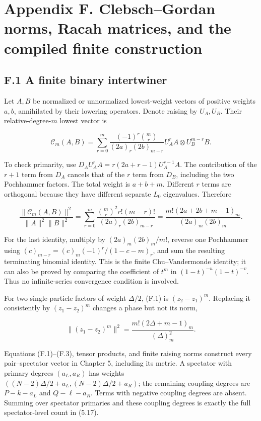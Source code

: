 \clearpage
\hypertarget{appendix-f.-clebschgordan-norms-racah-matrices-and-the-compiled-finite-construction}{%
\section{Appendix F. Clebsch--Gordan norms, Racah matrices, and the compiled finite construction}\label{appendix-f.-clebschgordan-norms-racah-matrices-and-the-compiled-finite-construction}}

\hypertarget{f.1-a-finite-binary-intertwiner}{%
\subsection{F.1 A finite binary intertwiner}\label{f.1-a-finite-binary-intertwiner}}

Let \(A,B\) be normalized or unnormalized lowest-weight vectors of positive weights \(a,b\), annihilated by their lowering operators. Denote raising by \(U_A,U_B\). Their relative-degree-\(m\) lowest vector is

\[
\mathcal C_m(A,B)=\sum_{r=0}^m
\frac{(-1)^r\binom mr}{(2a)_r(2b)_{m-r}}
U_A^rA\otimes U_B^{m-r}B.
\tag{F.1}
\]

To check primarity, use \(D_AU_A^rA=r(2a+r-1)U_A^{r-1}A\). The contribution of the \(r+1\) term from \(D_A\) cancels that of the \(r\) term from \(D_B\), including the two Pochhammer factors. The total weight is \(a+b+m\). Different \(r\) terms are orthogonal because they have different separate \(L_0\) eigenvalues. Therefore

\[
\frac{\|\mathcal C_m(A,B)\|^2}{\|A\|^2\|B\|^2}
=\sum_{r=0}^m\frac{\binom mr^2r!(m-r)!}{(2a)_r(2b)_{m-r}}
=\frac{m!(2a+2b+m-1)_m}{(2a)_m(2b)_m}.
\tag{F.2}
\]

For the last identity, multiply by \((2a)_m(2b)_m/m!\), reverse one Pochhammer using \((c)_{m-r}=(c)_m(-1)^r/(1-c-m)_r\), and sum the resulting terminating binomial identity. This is the finite Chu--Vandermonde identity; it can also be proved by comparing the coefficient of \(t^m\) in \((1-t)^{-u}(1-t)^{-v}\). Thus no infinite-series convergence condition is involved.

For two single-particle factors of weight \(\Delta/2\), (F.1) is \((z_2-z_1)^m\). Replacing it consistently by \((z_1-z_2)^m\) changes a phase but not its norm,

\[
\|(z_1-z_2)^m\|^2=\frac{m!(2\Delta+m-1)_m}{(\Delta)_m^2}.
\tag{F.3}
\]

Equations (F.1)--(F.3), tensor products, and finite raising norms construct every pair--spectator vector in Chapter 5, including its metric. A spectator with primary degrees \((a_L,a_R)\) has weights \(((N-2)\Delta/2+a_L,(N-2)\Delta/2+a_R)\); the remaining coupling degrees are \(P-k-a_L\) and \(Q-\ell-a_R\). Terms with negative coupling degrees are absent. Summing over spectator primaries and these coupling degrees is exactly the full spectator-level count in (5.17).

